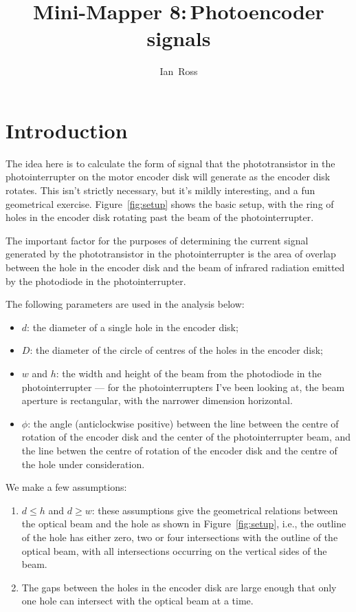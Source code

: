 \documentclass[a4paper,11pt,article]{memoir}
\title{Mini-Mapper 8:\,Photoencoder signals}
\author{Ian~Ross}
\begin{document}
\maketitle

\section*{Introduction}

The idea here is to calculate the form of signal that the
phototransistor in the photointerrupter on the motor encoder disk will
generate as the encoder disk rotates. This isn't strictly necessary,
but it's mildly interesting, and a fun geometrical exercise.
Figure~\ref{fig:setup} shows the basic setup, with the ring of holes
in the encoder disk rotating past the beam of the photointerrupter.

The important factor for the purposes of determining the current
signal generated by the phototransistor in the photointerrupter is the
area of overlap between the hole in the encoder disk and the beam of
infrared radiation emitted by the photodiode in the photointerrupter.

The following parameters are used in the analysis below:
\begin{itemize}
  \item{$d$: the diameter of a single hole in the encoder disk;}
  \item{$D$: the diameter of the circle of centres of the holes in the
    encoder disk;}
  \item{$w$ and $h$: the width and height of the beam from the
    photodiode in the photointerrupter --- for the photointerrupters
    I've been looking at, the beam aperture is rectangular, with the
    narrower dimension horizontal.}
  \item{$\phi$: the angle (anticlockwise positive) between the line
    between the centre of rotation of the encoder disk and the center
    of the photointerrupter beam, and the line betwen the centre of
    rotation of the encoder disk and the centre of the hole under
    consideration.}
\end{itemize}

We make a few assumptions:
\begin{enumerate}
  \item{$d \leq h$ and $d \geq w$: these assumptions give the
    geometrical relations between the optical beam and the hole as
    shown in Figure~\ref{fig:setup}, i.e., the outline of the hole has
    either zero, two or four intersections with the outline of the
    optical beam, with all intersections occurring on the vertical
    sides of the beam.}
  \item{The gaps between the holes in the encoder disk are large
    enough that only one hole can intersect with the optical beam at a
    time.}
\end{enumerate}
\end{document}
